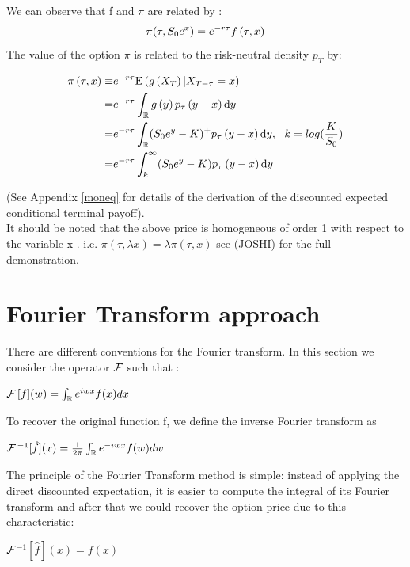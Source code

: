 \documentclass[12pt]{report}
\begin{document}
We can observe that f and $ \pi$ are related by :
\begin{gather}
\pi(\tau,S_0 e^x)= e^{-r\tau}f \left( {\tau,x} \right)
\end{gather}
The value of the option $\pi$ is related to the risk-neutral density $p_T$ by:


\begin{align}
\begin{split}
\pi\left( {\tau,x} \right) \equiv & e^{-r\tau}\mathrm{E} \left( {{g \left( {X_T} \right)|X_{T-\tau} = x}} \right)
\\
= &e^{-r\tau}\int_{\mathbb{R}} g\left( {y} \right)  p_\tau \left( {y-x} \right)  \textrm{d} y
\\
=& e^{-r\tau}\int_{\mathbb{R}} (S_0 e^y-K)^+ p_\tau \left( {y-x} \right)  \textrm{d} y, ~~k=log (\frac{K}{S_0})\\
=& e^{-r\tau} \int_k^\infty (S_0 e^y-K) p_\tau \left( {y-x} \right) \textrm{d} y
\label{moneq}
\end{split}
\end{align}

(See Appendix \eqref{moneq} for details of the derivation of the discounted expected conditional terminal payoff).\\ 
It should be noted that the above price is homogeneous of order 1 with respect to the variable x . i.e.
$\pi(\tau, \lambda x) = \lambda \pi(\tau,  x) $
see (JOSHI) for the full demonstration. 
\section{Fourier Transform approach}

There are different conventions for the Fourier transform. In this section we consider the operator
$\cal{F}$ such that :

\begin{center}
$\cal{F}$$[f](w)= \int_{\mathbb{R}} e^{iwx}f(x) dx $
\end{center}
To recover the original function f, we define the inverse Fourier transform as

\begin{center}
$\cal{F}$$^{-1}[\hat{f}] (x) =\frac{1}{2\pi}\int_{\mathbb{R}} e^{-iwx}f(w) dw $
\end{center}


The principle of the Fourier Transform method is simple: instead of applying the direct discounted expectation, it is easier to compute the integral of its Fourier transform and after that we could recover the option price due to this characteristic:
\begin{center}
$\cal{F}$$^{-1}[\hat{f}] (x)=f(x)$
\end{center} 
\end{document}
